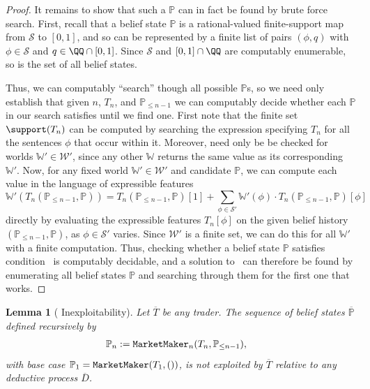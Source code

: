 \documentclass[authordate,onecolumn,noenvironments]{miri-tech-article}
\numberwithin{equation}{subsection}
\newtheorem{lemma}[theorem]{Lemma}
\newcommand{\seq}[1]{{\overline{#1}}}
\newcommand{\nn}{n}
\newcommand{\trade}{T}%
\newcommand{\Trader}{\seq{\trade}} %
\newcommand{\append}{,}
\newcommand{\marketmaker}{\text{\upshape{\texttt{MarketMaker}}}\xspace}
\newcommand{\BelState}{\mathbb{P}}
\newcommand{\pt}{\BelState}
\newcommand{\dt}{D}
\newcommand{\DP}{\seq{\dt}}
\newcommand{\World}{\mathbb{W}}
\newcommand{\Worlds}{\mathcal{W}}
\newcommand{\Sentences}{\mathcal{S}}
\begin{document}
\begin{proof}
It remains to show that such a $\BelState$ can in fact be found  by brute force search.  First, recall that a belief state $\BelState$ is a rational-valued finite-support map from $\Sentences$ to  $[0,1]$,
 and so can be represented by a finite list of pairs $(\phi,q)$ with $\phi\in\Sentences$ and $q\in\QQ\cap [0,1]$.  Since $\Sentences$ and $[0,1]\cap \QQ$  are computably enumerable, so is the set of all belief states.
 
Thus, we can computably ``search'' though all possible $\BelState$s, so we need 
only establish that given $n$, $\trade_\nn$, and $\pt_{\le \nn-1}$ we can computably decide whether each $\BelState$ in our search satisfies
 until we find one.  First note that the finite set $\support(\trade_\nn)$ can be computed by searching the expression specifying $\trade_\nn$ for all the sentences $\phi$ that occur within it.  Moreover,  need only be be checked for worlds $\World'\in\Worlds'$, since any other $\World$ returns the same value as its corresponding $\World'$.  Now, for any fixed world $\World'\in\Worlds'$ and candidate $\BelState$, we can compute each value in the language of expressible features 
\[
\World'(\trade_\nn(\pt_{\le \nn-1}\append\pt)) = \trade_\nn(\pt_{\le \nn-1}\append\pt)[1] + \sum_{\phi\in\Sentences'} \World'(\phi)\cdot \trade_\nn(\pt_{\le \nn-1}\append\pt)[\phi]
\]
directly by evaluating the expressible features $\trade_\nn[\phi]$ on the given belief history $(\pt_{\le \nn-1}\append\pt)$, as $\phi\in\Sentences'$ varies.  Since $\Worlds'$ is a finite set, we can do this for all $\World'$ with a finite computation.  Thus, checking whether
a belief state $\BelState$ satisfies condition~ is computably decidable, and a solution to~ can therefore be found by enumerating all belief states $\BelState$ and searching through them for the first one that works.
%
\end{proof}

\begin{lemma}[\marketmaker Inexploitability]\label{lem:mm}
  Let $\Trader$ be any trader.  The sequence of belief states $\seq\pt$ defined recursively by
  \begin{align*}
    \pt_\nn&:=\marketmaker_\nn(\trade_\nn,\pt_{\le \nn-1}),
  \end{align*}
  with base case $\pt_1 = \marketmaker(\trade_1,())$, is not exploited by $\Trader$ relative to any deductive process $\DP$.
\end{lemma}
\end{document}
